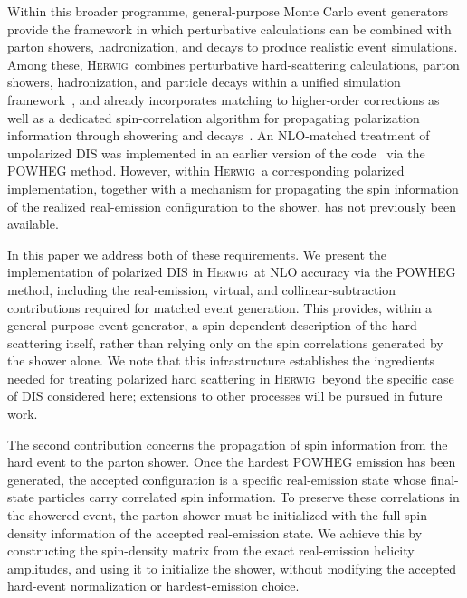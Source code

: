 \documentclass[a4paper,11pt]{article}
\newcommand{\Herwig}{\textsc{Herwig}}
\begin{document}
Within this broader programme, general-purpose Monte Carlo event generators provide the framework in which perturbative calculations can be combined with parton showers, hadronization, and decays to produce realistic event simulations. Among these, \Herwig\ combines perturbative hard-scattering calculations, parton showers, hadronization, and particle decays within a unified simulation framework~\cite{Bahr:2008pv,Gieseke:2011na,Arnold:2012fq,Bellm:2013hwb,Bellm:2015jjp,Bellm:2017bvx,Bellm:2019zci,Bewick:2023tfi,Bellm:2025pcw}, and already incorporates matching to higher-order corrections as well as a dedicated spin-correlation algorithm for propagating polarization information through showering and decays~\cite{Richardson:2018pvo}. An NLO-matched treatment of unpolarized DIS was implemented in an earlier version of the code~\cite{DErrico:2011wfa} via the POWHEG method. However, within \Herwig\ a corresponding polarized implementation, together with a mechanism for propagating the spin information of the realized real-emission configuration to the shower, has not previously been available.

In this paper we address both of these requirements. We present the implementation of polarized DIS in \Herwig\ at NLO accuracy via the POWHEG method, including the real-emission, virtual, and collinear-subtraction contributions required for matched event generation. This provides, within a general-purpose event generator, a spin-dependent description of the hard scattering itself, rather than relying only on the spin correlations generated by the shower alone. We note that this infrastructure establishes the ingredients needed for treating polarized hard scattering in \Herwig\ beyond the specific case of DIS considered here; extensions to other processes will be pursued in future work.

The second contribution concerns the propagation of spin information from the hard event to the parton shower. Once the hardest POWHEG emission has been generated, the accepted configuration is a specific real-emission state whose final-state particles carry correlated spin information. To preserve these correlations in the showered event, the parton shower must be initialized with the full spin-density information of the accepted real-emission state. We achieve this by constructing the spin-density matrix from the exact real-emission helicity amplitudes, and using it to initialize the shower, without modifying the accepted hard-event normalization or hardest-emission choice.
\end{document}
